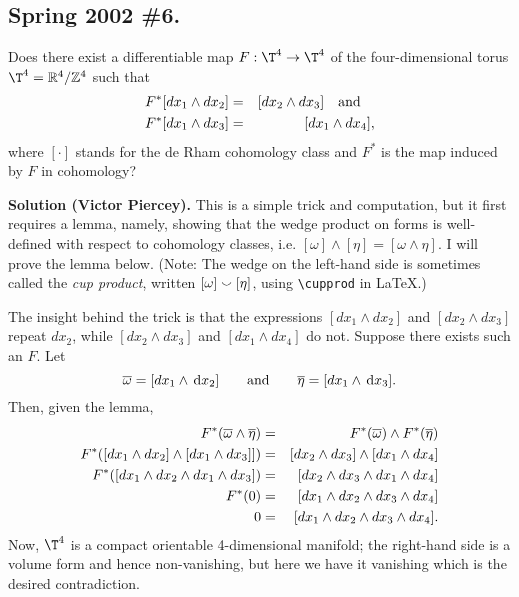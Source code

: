 \documentclass[10pt]{article}
\numberwithin{equation}{subsection}
\begin{document}
\subsection{Spring 2002 \#6.}

Does there exist a differentiable map $F: \T^4 \to \T^4$ of the
four-dimensional torus $\T^4 = \R^4/\Z^4$ such that
\begin{eqnarray*}
	F^*[dx_1 \wedge dx_2] &=& [dx_2 \wedge dx_3] \quad\textrm{and}\quad \\
	F^*[dx_1 \wedge dx_3] &=& [dx_1 \wedge dx_4],
\end{eqnarray*}
where $[\cdot]$ stands for the de Rham cohomology class and $F^*$ is the
map induced by $F$ in cohomology?

\textbf{Solution (Victor Piercey).}  This is a simple trick and computation,
but it first requires a lemma, namely, showing that the wedge product on forms
is well-defined with respect to cohomology classes, i.e. $[\omega] \wedge
[\eta] = [\omega \wedge \eta]$.  I will prove the lemma below.  (Note:  The
wedge on the left-hand side is sometimes called the \emph{cup product}, written
$[\omega] \smallsmile [\eta]$, using \texttt{{\textbackslash}cupprod} in
{\LaTeX}.)

The insight behind the trick is that the expressions
$[dx_1 \wedge dx_2]$ and
$[dx_2 \wedge dx_3]$ repeat $dx_2$, while
$[dx_2 \wedge dx_3]$ and
$[dx_1 \wedge dx_4]$ do not.
Suppose there exists such an $F$.  Let
$$
	\overline{\omega} = [dx_1 \wedge \,\mathrm{d}{x}_2]
	\qquad\textrm{and}\qquad
	\overline{\eta} = [dx_1 \wedge \,\mathrm{d}{x}_3].
$$
Then, given the lemma,
\begin{eqnarray*}
	F^*(\overline{\omega} \wedge \overline{\eta}) &=& F^*(\overline{\omega}) \wedge F^*(\overline{\eta}) \\
	F^*([dx_1 \wedge dx_2] \wedge [dx_1 \wedge dx_3]])
		&=& [dx_2 \wedge dx_3] \wedge [dx_1 \wedge dx_4] \\
	F^*([dx_1 \wedge dx_2 \wedge dx_1 \wedge dx_3])
		&=& [dx_2 \wedge dx_3 \wedge dx_1 \wedge dx_4] \\
	F^*(0) &=& [dx_1 \wedge dx_2 \wedge dx_3 \wedge dx_4] \\
	0 &=& [dx_1 \wedge dx_2 \wedge dx_3 \wedge dx_4].
\end{eqnarray*}
Now, $\T^4$ is a compact orientable 4-dimensional manifold; the right-hand side
is a volume form and hence non-vanishing, but here we have it vanishing which
is the desired contradiction.
\end{document}
